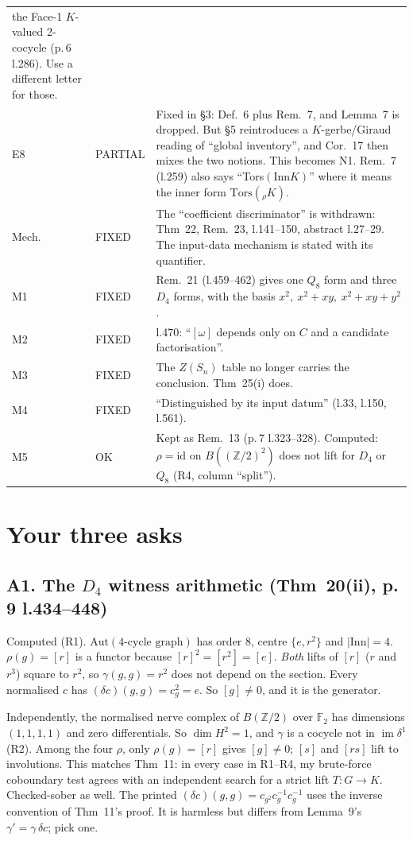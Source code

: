 \documentclass[11pt]{article}
\newcommand{\Z}{\mathbb{Z}}
\newcommand{\F}{\mathbb{F}}
\newcommand{\Inn}{\mathrm{Inn}}
\newcommand{\Aut}{\mathrm{Aut}}
\newcommand{\vd}[1]{\fbox{\textbf{#1}}}
\begin{document}
\begin{center}
\begin{tabular}{@{}p{1.1cm}p{2.0cm}p{12.2cm}@{}}
the Face-1 $K$-valued 2-cocycle (p.\,6 l.286). Use a different letter for those.\\
E8 & PARTIAL & Fixed in §3: Def.~6 plus Rem.~7, and Lemma~7 is dropped. But §5 reintroduces a
$K$-gerbe/Giraud reading of ``global inventory'', and Cor.~17 then mixes the two notions. This
becomes N1. Rem.~7 (l.259) also says ``Tors$(\Inn K)$'' where it means the inner form
$\mathrm{Tors}({}_\rho K)$.\\
Mech. & FIXED & The ``coefficient discriminator'' is withdrawn: Thm~22, Rem.~23, l.141--150,
abstract l.27--29. The input-data mechanism is stated with its quantifier.\\
M1 & FIXED & Rem.~21 (l.459--462) gives one $Q_8$ form and three $D_4$ forms, with the basis
$x^2,\ x^2+xy,\ x^2+xy+y^2$.\\
M2 & FIXED & l.470: ``$[\omega]$ depends only on $C$ and a candidate factorisation''.\\
M3 & FIXED & The $Z(S_n)$ table no longer carries the conclusion. Thm~25(i) does.\\
M4 & FIXED & ``Distinguished by its input datum'' (l.33, l.150, l.561).\\
M5 & OK & Kept as Rem.~13 (p.\,7 l.323--328). Computed: $\rho=\mathrm{id}$ on $B((\Z/2)^2)$ does not
lift for $D_4$ or $Q_8$ (R4, column ``split'').\\
\bottomrule
\end{tabular}
\end{center}

\section{Your three asks}

\subsection*{A1. The $D_4$ witness arithmetic (Thm~20(ii), p.\,9 l.434--448) \hfill \vd{OK}}
Computed (R1). $\Aut(\text{4-cycle graph})$ has order 8, centre $\{e,r^2\}$ and $|\Inn|=4$.
$\rho(g)=[r]$ is a functor because $[r]^2=[r^2]=[e]$. \emph{Both} lifts of $[r]$ ($r$ and $r^3$)
square to $r^2$, so $\gamma(g,g)=r^2$ does not depend on the section. Every normalised $c$ has
$(\delta c)(g,g)=c_g^2=e$. So $[g]\ne0$, and it is the generator.

Independently, the normalised nerve complex of $B(\Z/2)$ over $\F_2$ has dimensions $(1,1,1,1)$
and zero differentials. So $\dim H^2=1$, and $\gamma$ is a cocycle not in $\operatorname{im}\delta^1$
(R2). Among the four $\rho$, only $\rho(g)=[r]$ gives $[g]\neq0$; $[s]$ and $[rs]$ lift to
involutions. This matches Thm~11: in every case in R1--R4, my brute-force coboundary test agrees with
an independent search for a strict lift $T:G\to K$. Checked-sober as well. The printed
$(\delta c)(g,g)=c_{g^2}c_g^{-1}c_g^{-1}$ uses the inverse convention of Thm~11's proof. It is
harmless but differs from Lemma~9's $\gamma'=\gamma\,\delta c$; pick one.
\end{document}
